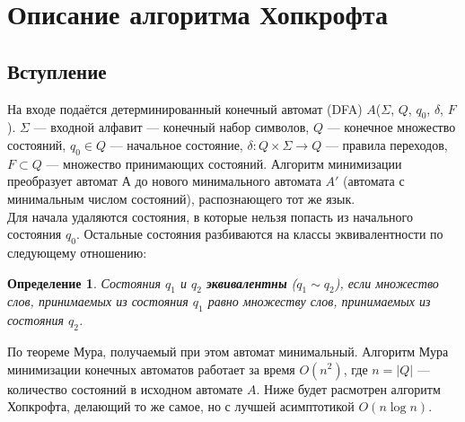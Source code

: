 \documentclass{article}
\newtheorem{definition}{Определение}%
\begin{document}
\section{Описание алгоритма Хопкрофта}
\subsection{Вступление}
На входе подаётся детерминированный конечный автомат (DFA) $A$($\Sigma$, $Q$, $q_0$, $\delta$, $F$). $\Sigma$ --- входной алфавит --- конечный набор символов, $Q$ --- конечное множество состояний, $q_0 \in Q$ --- начальное состояние, $\delta: Q \times \Sigma \longrightarrow Q$ --- правила переходов, $F \subset Q$ --- множество принимающих состояний. Алгоритм минимизации преобразует автомат $А$ до нового минимального автомата $A'$ (автомата с минимальным числом состояний), распознающего тот же язык.\\
Для начала удаляются состояния, в которые нельзя попасть из начального состояния $q_0$. Остальные состояния разбиваются на классы эквивалентности по следующему отношению:
\begin{definition}
Состояния $q_1$ и $q_2$ \textbf{эквивалентны} ($q_1 \sim q_2$), если множество слов, принимаемых из состояния $q_1$ равно множеству слов, принимаемых из состояния $q_2$.
\end{definition}
По теореме Мура, получаемый при этом автомат минимальный. Алгоритм Мура минимизации конечных автоматов работает за время $O(n^2)$, где $n = |Q|$ --- количество состояний в исходном автомате $A$. Ниже будет расмотрен алгоритм Хопкрофта, делающий то же самое, но с лучшей асимптотикой $O(n \log n)$.\\
\end{document}

